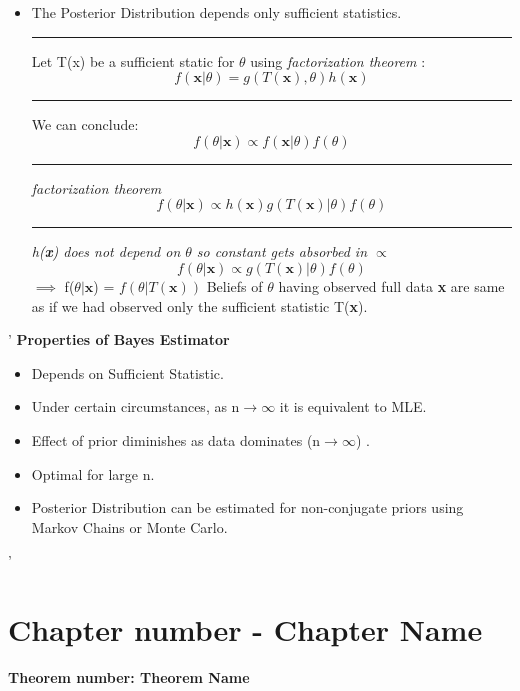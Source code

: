 \documentclass[]{article}
\begin{document}
\newpage
\begin{itemize}
	\item The Posterior Distribution depends only sufficient statistics. 
	\newline
	\newline \Large\rule{1.3cm}{0pt} Let T(x) be a sufficient static for $\theta$ using \textit{factorization theorem} :
	\[  f(\textbf{x}| \theta  )  =  g(T(\textbf{x}), \theta) h(\textbf{x}) \]
	\newline \Large\rule{1.3cm}{0pt}  We can conclude: 
	\[  f(\theta | \textbf{x})  \propto f(\textbf{x} | \theta) f( \theta)  \]
	\Large\rule{1.3cm}{0pt}\textit{factorization theorem} 
	\[  f(\theta | \textbf{x})  \propto h(\textbf{x}) g(T(\textbf{x})| \theta)  f( \theta)  \]
	\Large\rule{1.3cm}{0pt}\textit{h(\textbf{x}) does not depend on $\theta$ so constant gets absorbed in $\propto$}  
	\[  f(\theta | \textbf{x})  \propto g(T(\textbf{x})| \theta)  f( \theta)  \]
	$\implies$ f($\theta | \textbf{x} $)  = $f(\theta | T(\textbf{x}))$
	\newline\newline Beliefs of $\theta$ having observed full data \textbf{x} are same as if we had observed only the sufficient statistic T(\textbf{x}).
\end{itemize}'
\newline \Large\textbf{Properties of Bayes Estimator}
\begin{itemize}
	\item Depends on Sufficient Statistic.
	\item Under certain circumstances, as n$\to\infty$ it is equivalent to MLE.
	\item Effect of prior diminishes as data dominates (n$\to\infty$) .
	\item Optimal for large n.
	\item Posterior Distribution can be estimated for non-conjugate priors using Markov Chains or Monte Carlo.
\end{itemize}'

\newpage
\section{Chapter number - Chapter Name}
\Large\textbf{Theorem number: Theorem Name}
\end{document}

